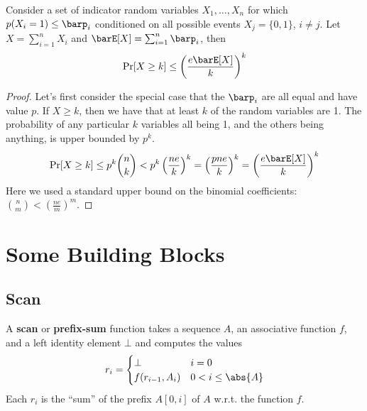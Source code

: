 \documentclass[11pt]{article}
\begin{document}
\begin{theorem}[]
Consider a set of indicator random variables \(X_1,\dots,X_n\) for which \(p(X_i=1)\le\barp_i\) conditioned on
all possible events \(X_j=\{0,1\}\), \(i\neq j\). Let \(X=\sum_{i=1}^nX_i\) and \(\barE[X]=\sum_{i=1}^n\barp_i\),
then
\begin{equation*}
\Pr[X\ge k]\le\left( \frac{e\barE[X]}{k} \right)^k
\end{equation*}
\end{theorem}

\begin{proof}
Let's first consider the special case that the \(\barp_i\) are all equal and have value \(p\). If
\(X\ge k\), then we have that at least \(k\) of the random variables are 1. The probability of any
particular \(k\) variables all being 1, and the others being anything, is upper bounded by \(p^k\).
\begin{equation*}
\Pr[X\ge k]\le p^k\binom{n}{k}<p^k\left(\frac{ne}{k}\right)^k
=\left(\frac{pne}{k}\right)^k=
\left(\frac{e\barE[X]}{k}\right)^k
\end{equation*}
Here we used a standard upper bound on the binomial coefficients: \(\binom{n}{m}<\left(\frac{ne}{m}\right)^m\).
\end{proof}
\section{Some Building Blocks}
\label{sec:org7224ff2}
\subsection{Scan}
\label{sec:org0261658}
A \textbf{scan} or \textbf{prefix-sum} function takes a sequence \(A\), an associative function \(f\), and a left
identity element \(\bot\) and computes the values
\begin{equation*}
r_i=
\begin{cases}
\bot&i=0\\
f(r_{i-1},A_i)&0<i\le\abs{A}
\end{cases}
\end{equation*}
Each \(r_i\) is the ``sum'' of the prefix \(A[0,i]\) of \(A\) w.r.t. the function \(f\).


\begin{algorithm}
\;
\end{algorithm}
\end{document}
